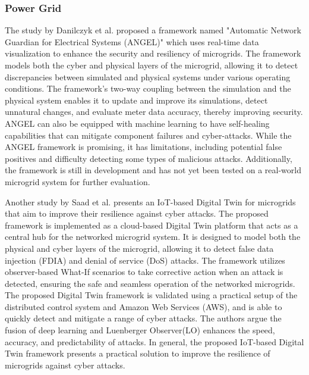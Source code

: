 

\subsubsection*{Power Grid}
The study by Danilczyk et al.\cite{williamdanilczykANGELIntelligentDigital2019} proposed a framework named "Automatic Network Guardian for Electrical Systems (ANGEL)" which uses real-time data visualization to enhance the security and resiliency of microgrids. The framework models both the cyber and physical layers of the microgrid, allowing it to detect discrepancies between simulated and physical systems under various operating conditions. The framework's two-way coupling between the simulation and the physical system enables it to update and improve its simulations, detect unnatural changes, and evaluate meter data accuracy, thereby improving security. ANGEL can also be equipped with machine learning to have self-healing capabilities that can mitigate component failures and cyber-attacks. While the ANGEL framework is promising, it has limitations, including potential false positives and difficulty detecting some types of malicious attacks. Additionally, the framework is still in development and has not yet been tested on a real-world microgrid system for further evaluation.

Another study by Saad et al.\cite{saadImplementationIoTBasedDigital2020} presents an IoT-based Digital Twin for microgrids that aim to improve their resilience against cyber attacks. The proposed framework is implemented as a cloud-based Digital Twin platform that acts as a central hub for the networked microgrid system. It is designed to model both the physical and cyber layers of the microgrid, allowing it to detect false data injection (FDIA) and denial of service (DoS) attacks. The framework utilizes observer-based What-If scenarios to take corrective action when an attack is detected, ensuring the safe and seamless operation of the networked microgrids. The proposed Digital Twin framework is validated using a practical setup of the distributed control system and Amazon Web Services (AWS), and is able to quickly detect and mitigate a range of cyber attacks. The authors argue  the fusion of deep learning and Luenberger Observer(LO) enhances the speed, accuracy, and predictability of attacks. In general, the proposed IoT-based Digital Twin framework presents a practical solution to improve the resilience of microgrids against cyber attacks.


